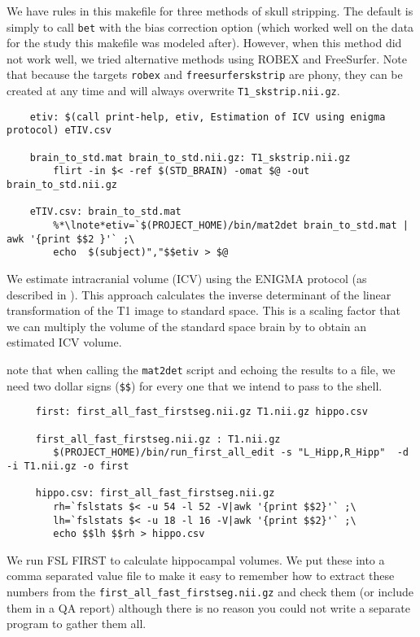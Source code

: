 We have rules in this makefile for three methods of skull
stripping. The default is simply to call \texttt{bet} with the bias
correction option (which worked well on the data for the study this
makefile was modeled after). However, when this method did not work
well, we tried alternative methods using ROBEX and FreeSurfer. Note
that because the targets \texttt{robex} and \texttt{freesurferskstrip}
are phony, they can be created at any time and will always overwrite
\texttt{T1_skstrip.nii.gz}. 


\begin{lstlisting}
	etiv: $(call print-help, etiv, Estimation of ICV using enigma protocol) eTIV.csv

	brain_to_std.mat brain_to_std.nii.gz: T1_skstrip.nii.gz 
		flirt -in $< -ref $(STD_BRAIN) -omat $@ -out brain_to_std.nii.gz

	eTIV.csv: brain_to_std.mat
		%*\lnote*etiv=`$(PROJECT_HOME)/bin/mat2det brain_to_std.mat | awk '{print $$2 }'` ;\
		echo  $(subject)","$$etiv > $@
\end{lstlisting}

We estimate intracranial volume (ICV) using the ENIGMA protocol (as described in
). This approach calculates the inverse 
determinant of the linear transformation of the T1 image to standard
space. This is a scaling factor that we can multiply the volume of the
standard space brain by to obtain an estimated ICV volume. 

 note that when calling the \texttt{mat2det} script and
echoing the results to a file, we need two dollar signs (\texttt{\$\$})
for every one that we intend to pass to the shell.  



\begin{lstlisting}
	 first: first_all_fast_firstseg.nii.gz T1.nii.gz hippo.csv

	 first_all_fast_firstseg.nii.gz : T1.nii.gz
		$(PROJECT_HOME)/bin/run_first_all_edit -s "L_Hipp,R_Hipp"  -d -i T1.nii.gz -o first

	 hippo.csv: first_all_fast_firstseg.nii.gz 
		rh=`fslstats $< -u 54 -l 52 -V|awk '{print $$2}'` ;\
		lh=`fslstats $< -u 18 -l 16 -V|awk '{print $$2}'` ;\
		echo $$lh $$rh > hippo.csv
\end{lstlisting}

We run FSL FIRST to calculate hippocampal volumes. We put these into a
comma separated value file to make it easy to remember how to extract
these numbers from the \texttt{first_all_fast_firstseg.nii.gz} and
check them (or include them in a QA report) although there is no
reason you could not write a separate program to gather them all.


